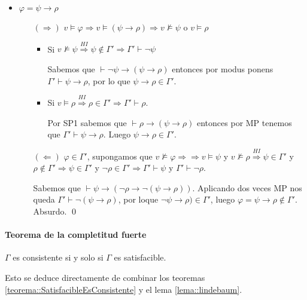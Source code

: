 \begin{demoPart}
\begin{itemize}
		\item $\varphi=\psi\to\rho$
				\begin{itemize}
			\item[$(\Rightarrow)$] $v\vDash\varphi\Rightarrow v\vDash(\psi\to\rho)\Rightarrow v\nvDash\psi$ o $v\vDash\rho$
			\begin{itemize}
				\item Si $v\nvDash\psi\overset{HI}{\Rightarrow}\psi\notin\Gamma'\Rightarrow \Gamma'\vdash\lnot\psi$
				
				Sabemos que $\vdash\lnot\psi\to(\psi\to\rho)$ entonces por modus ponens $\Gamma'\vdash\psi\to\rho$, por lo que $\psi\to\rho\in\Gamma'$.
				
				\item Si $v\vDash\rho\overset{HI}{\Rightarrow}\rho\in\Gamma'\Rightarrow\Gamma'\vdash\rho$.
				
				Por SP1 sabemos que $\vdash\rho\to(\psi\to\rho)$ entonces por MP tenemos que $\Gamma'\vdash\psi\to\rho$. Luego $\psi\to\rho\in\Gamma'$.
			\end{itemize}
		\item[$\bm{(\Leftarrow)}$] $\varphi\in\Gamma'$, supongamos que $v\nvDash\varphi\Rightarrow\Rightarrow v\vDash\psi$ y $v\nvDash\rho\overset{HI}{\Rightarrow}\psi\in\Gamma'$ y $\rho\notin\Gamma'\Rightarrow \psi\in\Gamma'$ y $\lnot\rho\in\Gamma' \Rightarrow \Gamma'\vdash\psi$ y $\Gamma'\vdash\lnot\rho$.
		
		Sabemos que $\vdash\psi\to(\lnot\rho\to\lnot(\psi\to\rho))$. Aplicando dos veces MP nos queda $\Gamma'\vdash\lnot(\psi\to\rho)$, por loque $\lnot\psi\to\rho)\in\Gamma'$, luego $\varphi= \psi\to\rho\notin\Gamma'$. Absurdo. \qed 
		\end{itemize}
	\end{itemize}
\end{demoPart}

\paragraph{Teorema de la completitud fuerte}

\begin{corolario}\label{corolario::ConsistenteSiiSatisfacible}
	$\Gamma$ es consistente si y solo si $\Gamma$ es satisfacible.
\end{corolario}

Esto se deduce directamente de combinar los teoremas  \ref{teorema::SatisfacibleEsConsistente} y el lema \ref{lema::lindebaum}.

